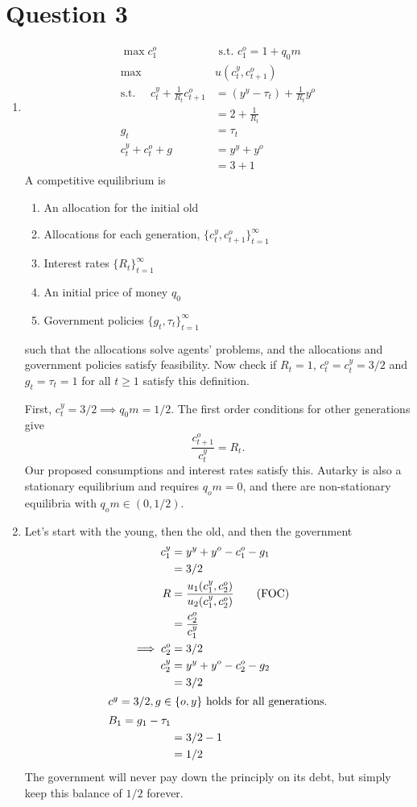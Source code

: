 \documentclass[11pt]{article}
\begin{document}
\section{Question 3}
\label{sec:org6ad3cf1}
  \begin{enumerate}[label=\alph*)]
\item
  \begin{align*}
\max c_1^o \quad &\text{ s.t. } c_1^o = 1 + q_0 m \tag{initial old}\\
\max &u(c_t^y, c_{t + 1}^o) \tag{other generations}\\
\text{s.t. } \quad c^y_t + \frac{1}{R_t} c^o_{t + 1} &= (y^y - \tau_t) + \frac{1}{R_t}y^o\\
&= 2 + \frac{1}{R_t}\\
g_t &= \tau_t \tag{government}\\
c_t^y + c_t^o + g &= y^y + y^o \tag{feasibility}\\
&= 3 + 1
  \end{align*}
A competitive equilibrium is
\begin{enumerate}
\item An allocation for the initial old
\item Allocations for each generation, $\{c^y_t, c^o_{t + 1}\}^\infty_{t = 1}$
\item Interest rates $\{R_t\}^\infty_{t = 1}$
\item An initial price of money $q_0$
\item Government policies $\{g_t, \tau_t\}^\infty_{t = 1}$
\end{enumerate}
such that the allocations solve agents' problems, and the allocations and government policies satisfy feasibility. Now check if \(R_t = 1\), \(c_t^o = c_t^y = 3/2\) and \(g_t = \tau_t = 1\) for all \(t \ge 1\) satisfy this definition.

First, \(c_t^y = 3/2 \implies q_0 m = 1/2\). The first order conditions for other generations give
\[
\frac{c^o_{t + 1}}{c_t^y} = R_t.
\]
Our proposed consumptions and interest rates satisfy this. Autarky is also a stationary equilibrium and requires \(q_o m = 0\), and there are non-stationary equilibria with \(q_o m \in (0, 1/2)\).

\item Let's start with the young, then the old, and then the government
\begin{align*}
c_1^y &= y^y + y^o - c_1^o - g_1\\
&= 3/2 \\
R &= \frac{u_1(c_1^y, c_2^o)}{u_2(c_1^y, c_2^o)} \tag{FOC}\\
&= \frac{c_2^o}{c_1^y}\\
\implies c_2^o &= 3/2\\
c_2^y &= y^y + y^o - c_2^o - g_2\\
&= 3/2\\
\intertext{$c^g = 3/2 ,g \in \{o, y\}$ holds for all generations.}
B_1 = g_1 - \tau_1 \\
&= 3/2 - 1\\
&= 1/2 
\end{align*}
The government will never pay down the principly on its debt, but simply keep this balance of \(1/2\) forever.


\end{enumerate}
\end{document}

